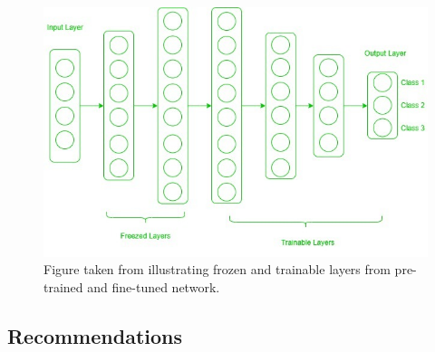 \documentclass[11pt]{article}
\begin{document}
\begin{figure}[H]
    \centering
    \includegraphics[width=0.7\linewidth]{images/Frozen-layers.jpg}
    \caption{Figure taken from \cite{geeks-transfer-learning} illustrating frozen and trainable layers from pre-trained and fine-tuned network.}
    \label{fig:frozen-layers}
\end{figure}

\subsection{Recommendations}
\end{document}
